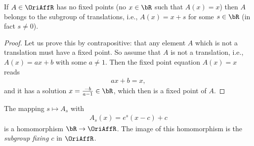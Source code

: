 \begin{lemma}
  \label{lem:no-fixed-point-implies-translation}
  \leanok
  If $A \in \OriAffR$ has no fixed points (no $x \in \bR$ such that $A(x) = x$)
  then $A$ belongs to the subgroup of translations, i.e., $A(x) = x + s$
  for some $s \in \bR$ (in fact $s \ne 0$).
\end{lemma}
\begin{proof}
  Let us prove this by contrapositive: that any element $A$ which is not a
  translation must have a fixed point.
  So assume that $A$ is not a translation, i.e.,
  $A(x) = a x + b$ with some $a \ne 1$. Then the fixed point equation
  $A(x) = x$ reads
  \begin{align*}
    a x + b = x  ,
  \end{align*}
  and it has a solution $x = \frac{-b}{a-1} \in \bR$, which then is a
  fixed point of $A$.
\end{proof}

\begin{definition}
  \label{def:fixing-subgroup}
  The mapping $s \mapsto A_s$ with
  \begin{align*}
    A_s(x) = e^{s} (x - c) + c
  \end{align*}
  is a homomorphism $\bR \to \OriAffR$. The image of this
  homomorphism is the \emph{subgroup fixing $c$} in $\OriAffR$.
\end{definition}

